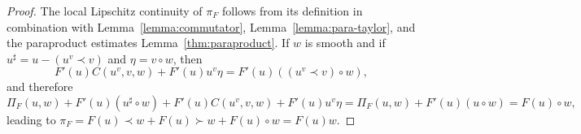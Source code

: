 \documentclass[11pt,a4paper]{article}
\newcommand{\cdummy}{\cdot}
\theoremstyle{remark}
\begin{document}
\begin{proof}
  The local Lipschitz continuity of $\pi_{F}$ follows from its definition in
  combination with Lemma~\ref{lemma:commutator},
  Lemma~\ref{lemma:para-taylor}, and the paraproduct estimates
  Lemma~\ref{thm:paraproduct}. %
  If $w$ is smooth and if $u^{\sharp} =u- ( u^{v} \prec v )$ and $\eta =v \circ w$, then
  \[
     F' ( u ) C ( u^{v} ,v,w ) +F' ( u ) u^{v} \eta =F' ( u ) ( ( u^{v} \prec v ) \circ w ) ,
  \]
  and therefore
  \[
     \Pi_{F} ( u,w ) +F' ( u ) ( u^{\sharp} \circ w ) +F' ( u ) C ( u^{v} ,v,w ) +F' ( u ) u^{v} \eta = \Pi_{F} ( u,w ) +F' ( u ) ( u \circ w ) =F ( u ) \circ w,
  \]
  leading to $\pi_{F} =F ( u ) \prec w+F ( u ) \succ w+F ( u ) \circ w = F (u) w$.
  

\end{proof}
\end{document}
